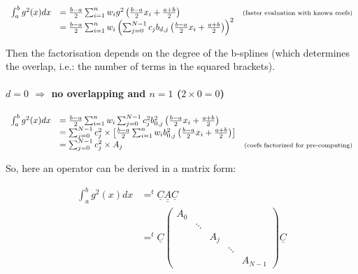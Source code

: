 \documentclass[paper=a4, fontsize=11pt]{book}
\numberwithin{equation}{section}		%
\numberwithin{figure}{section}			%
\numberwithin{table}{section}				%
\begin{document}
$$
\begin{array}{lll}
\int_a^b g^2(x)dx & = \frac{b-a}{2}\sum_{i=1}^n w_i g^2\left(\frac{b-a}{2}x_i + \frac{a+b}{2}\right) & \text{\scriptsize (faster evaluation with known coefs)}\\
& = \frac{b-a}{2}\sum_{i=1}^n w_i \left(\sum_{j=0}^{N-1} c_jb_{d,j}\left(\frac{b-a}{2}x_i + \frac{a+b}{2}\right)\right)^2 & \\
\end{array}
$$

Then the factorisation depends on the degree of the b-splines (which determines the overlap, i.e.: the number of terms in the squared brackets).

\paragraph{\textbf{$d=0$ $\Rightarrow$ no overlapping and $n=1$ ($2\times0=0$)}}
$$
\begin{array}{lll}
\int_a^b g^2(x)dx & = \frac{b-a}{2}\sum_{i=1}^n w_i \sum_{j=0}^{N-1} c_j^2b_{0,j}^2\left(\frac{b-a}{2}x_i + \frac{a+b}{2}\right) & \\
& = \sum_{j=0}^{N-1} c_j^2 \times \left[\frac{b-a}{2}\sum_{i=1}^n w_i b_{0,j}^2\left(\frac{b-a}{2}x_i + \frac{a+b}{2}\right) \right] & \\
& = \sum_{j=0}^{N-1} c_j^2 \times A_j & \text{\scriptsize (coefs factorized for pre-computing)}
\end{array}
$$

So, here an operator can be derived in a matrix form:

$$
\begin{array}{ll}
\int_a^b g^2(x)dx & = ^t\underline{C}\underline{\underline{A}}\underline{C}\\
& = ^t\underline{C} \left(\begin{array}{ccccc}A_0 &&&&\\ &\ddots&&&\\&&A_j&&\\&&&\ddots&\\&&&&A_{N-1} \end{array}\right) \underline{C}
\end{array}
$$
\end{document}
